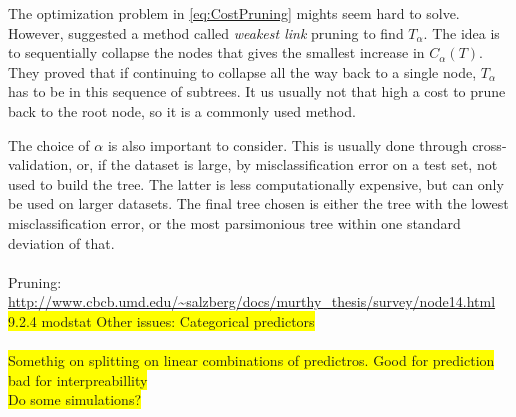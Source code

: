 The optimization problem in \eqref{eq:CostPruning} mights seem hard to solve. However, \cite{breiman} suggested a method called \textit{weakest link} pruning to find $T_\alpha$. The idea is to sequentially collapse the nodes that gives the smallest increase in $C_\alpha(T)$.
They proved that if continuing to collapse all the way back to a single node, $T_\alpha$ has to be in this sequence of subtrees. It us usually not that high a cost to prune back to the root node, so it is a commonly used method.

The choice of $\alpha$ is also important to consider. This is usually done through cross-validation, or, if the dataset is large, by misclassification error on a test set, not used to build the tree. The latter is less computationally expensive, but can only be used on larger datasets. The final tree chosen is either the tree with the lowest misclassification error, or the most parsimonious tree within one standard deviation of that.
\\
\\ Pruning: \url{http://www.cbcb.umd.edu/~salzberg/docs/murthy_thesis/survey/node14.html}\\
\colorbox{yellow}{9.2.4 modstat Other issues: Categorical predictors} \\ \\
%
\colorbox{yellow}{Somethig on splitting on linear combinations of predictros. Good for prediction bad for interpreabillity}\\
\colorbox{yellow}{Do some simulations?}\\


